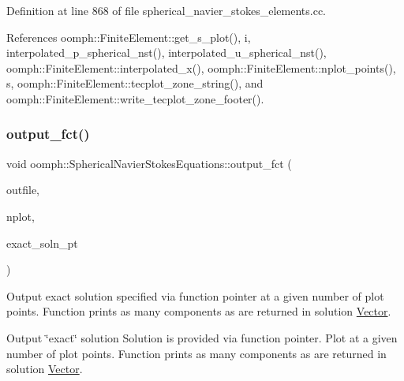 Definition at line 868 of file spherical\+\_\+navier\+\_\+stokes\+\_\+elements.\+cc.



References oomph\+::\+Finite\+Element\+::get\+\_\+s\+\_\+plot(), i, interpolated\+\_\+p\+\_\+spherical\+\_\+nst(), interpolated\+\_\+u\+\_\+spherical\+\_\+nst(), oomph\+::\+Finite\+Element\+::interpolated\+\_\+x(), oomph\+::\+Finite\+Element\+::nplot\+\_\+points(), s, oomph\+::\+Finite\+Element\+::tecplot\+\_\+zone\+\_\+string(), and oomph\+::\+Finite\+Element\+::write\+\_\+tecplot\+\_\+zone\+\_\+footer().

\mbox{\label{classoomph_1_1SphericalNavierStokesEquations_aa273df1ad9fe7cebb284bdae8b7e1a21}} 
\subsubsection{\texorpdfstring{output\+\_\+fct()}{output\_fct()}\hspace{0.1cm}{\footnotesize\ttfamily [1/2]}}
{\footnotesize\ttfamily void oomph\+::\+Spherical\+Navier\+Stokes\+Equations\+::output\+\_\+fct (\begin{DoxyParamCaption}\item[{std\+::ostream \&}]{outfile,  }\item[{const unsigned \&}]{nplot,  }\item[{\hyperlink{classoomph_1_1FiniteElement_a690fd33af26cc3e84f39bba6d5a85202}{Finite\+Element\+::\+Steady\+Exact\+Solution\+Fct\+Pt}}]{exact\+\_\+soln\+\_\+pt }\end{DoxyParamCaption})\hspace{0.3cm}{\ttfamily [virtual]}}



Output exact solution specified via function pointer at a given number of plot points. Function prints as many components as are returned in solution \hyperlink{classoomph_1_1Vector}{Vector}. 

Output \char`\"{}exact\char`\"{} solution Solution is provided via function pointer. Plot at a given number of plot points. Function prints as many components as are returned in solution \hyperlink{classoomph_1_1Vector}{Vector}. 

